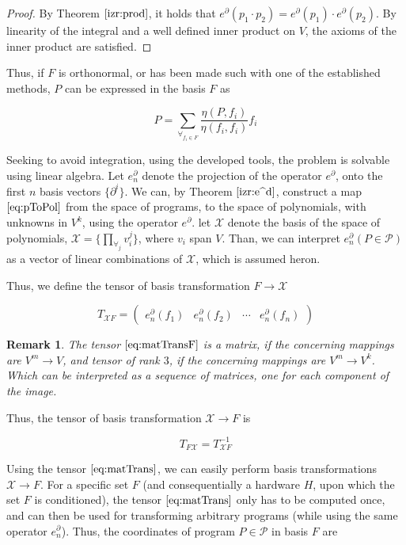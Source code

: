 \documentclass{article}
\newcommand{\X}{\mathcal{X}}
\newcommand{\dP}{\mathcal{P}}
\newcommand{\D}{\partial}
\newtheorem{opomba}{Remark}[section]
\begin{document}
  \begin{proof}
  By Theorem $\ref{izr:prod}$, it holds that $e^\D(p_1\cdot p_2)=e^\D(p_1)\cdot e^\D(p_2)$. By linearity of the integral and a well defined inner product on $V$, the axioms of the inner product are satisfied.
  \end{proof}
  
  Thus, if $F$ is orthonormal, or has been made such with one of the established methods, $P$ can be expressed in the basis $F$ as
  
  \begin{equation}
 	P=\sum\limits_{\forall_{f_i\in F}}\frac{\eta(P,f_i)}{\eta(f_i,f_i)}f_i
  \end{equation}
  
  Seeking to avoid integration, using the developed tools, the problem is solvable using linear algebra. Let $e^\D_n$ denote the projection of the operator $e^\D$, onto the first $n$ basis vectors $\{\D^i\}$. We can, by Theorem $\ref{izr:e^d}$, construct a map $\eqref{eq:pToPol}$ from the space of programs, to the space of polynomials, with unknowns in $V^k$, using the operator $e^\D$. let $\X$ denote the basis of the space of polynomials, $\X=\{\prod\limits_{\forall_j} v_i^j\}$, where $v_i$ span $V$. Than, we can interpret $e^\D_n(P\in\dP)$ as a vector of linear combinations of $\X$, which is assumed heron.
  
  Thus, we define the tensor of basis transformation $F\to\X$
  
  \begin{equation}\label{eq:matTransF}
  T_{\X F}=\begin{pmatrix}
  e_n^\D(f_1) & e_n^\D(f_2) & \cdots & e_n^\D(f_n)
  \end{pmatrix}
  \end{equation}
  
  \begin{opomba}
  The tensor $\eqref{eq:matTransF}$ is a matrix, if the concerning mappings are $V^m\to V$, and tensor of rank $3$, if the concerning mappings are $V^m\to V^k$. Which can be interpreted as a sequence of matrices, one for each component of the image.
  \end{opomba}
  
  Thus, the tensor of basis transformation $\X\to F$ is
  
  \begin{equation}\label{eq:matTrans}
  T_{F\X}=T_{\X F}^{-1}
  \end{equation}
  
  Using the tensor $\eqref{eq:matTrans}$, we can easily perform basis transformations $\X\to F$. For a specific set $F$ (and consequentially a hardware $H$, upon which the set $F$ is conditioned), the tensor $\eqref{eq:matTrans}$ only has to be computed once, and can then be used for transforming arbitrary programs (while using the same operator $e^\D_n$).
  Thus, the coordinates of program $P\in\dP$ in basis $F$ are
  
\end{document}
